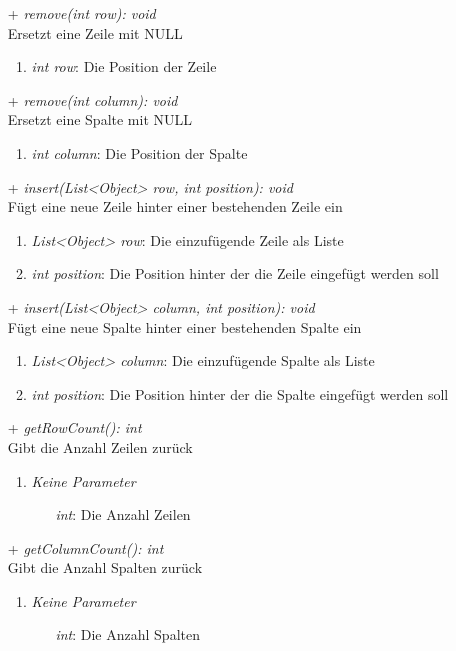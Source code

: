 \begin{itemize}
	\item[+] \textit{remove(int row): void} \\
	Ersetzt eine Zeile mit NULL
	\begin{enumerate}
		\item \textit{int row}: Die Position der Zeile
	\end{enumerate}

	\item[+] \textit{remove(int column): void} \\
	Ersetzt eine Spalte mit NULL
	\begin{enumerate}
		\item \textit{int column}: Die Position der Spalte
	\end{enumerate}

	\item[+] \textit{insert(List<Object> row, int position): void} \\
	Fügt eine neue Zeile hinter einer bestehenden Zeile ein
	\begin{enumerate}
		\item \textit{List<Object> row}: Die einzufügende Zeile als Liste
		\item \textit{int position}: Die Position hinter der die Zeile eingefügt werden soll
	\end{enumerate}

	\item[+] \textit{insert(List<Object> column, int position): void} \\
	Fügt eine neue Spalte hinter einer bestehenden Spalte ein
	\begin{enumerate}
		\item \textit{List<Object> column}: Die einzufügende Spalte als Liste
		\item \textit{int position}: Die Position hinter der die Spalte eingefügt werden soll
	\end{enumerate}

	\item[+] \textit{getRowCount(): int} \\
	Gibt die Anzahl Zeilen zurück
	\begin{enumerate}
		\item \textit{Keine Parameter}
		\begin{itemize}
			\item[] \textit{int}: Die Anzahl Zeilen
		\end{itemize}
	\end{enumerate}

	\item[+] \textit{getColumnCount(): int} \\
	Gibt die Anzahl Spalten zurück
	\begin{enumerate}
		\item \textit{Keine Parameter}
		\begin{itemize}
			\item[] \textit{int}: Die Anzahl Spalten
		\end{itemize}
	\end{enumerate}
	

\end{itemize}
